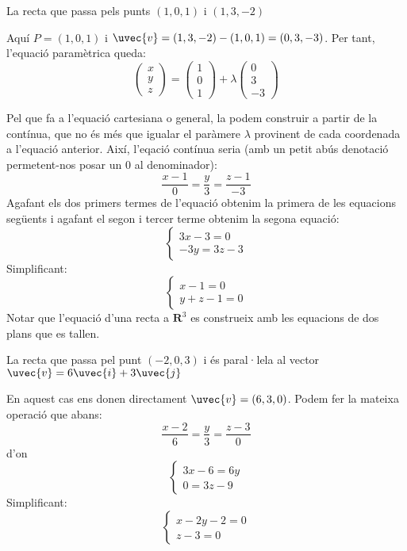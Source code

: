 \begin{llista}
  \item La recta que passa pels punts $(1,0,1)$ i $(1,3,-2)$

  Aquí $P=(1,0,1)$ i $\uvec{v}=(1,3,-2)-(1,0,1)=(0,3,-3)$. Per tant, l'equació paramètrica queda:
  \[
  \begin{pmatrix}x\\y\\z\end{pmatrix}= \begin{pmatrix}1\\0\\1\end{pmatrix}+\lambda\begin{pmatrix}0\\3\\-3\end{pmatrix}
  \]

  Pel que fa a l'equació cartesiana o general, la podem construir a partir de la contínua, que no és més que igualar el paràmere $\lambda$ provinent de cada coordenada a l'equació anterior. Així, l'eqació contínua seria (amb un petit abús denotació permetent-nos posar un $0$ al denominador):
  \[
  \frac{x-1}{0}=\frac{y}{3}=\frac{z-1}{-3}
  \]
  Agafant els dos primers termes de l'equació obtenim la primera de les equacions següents i agafant el segon i tercer terme obtenim la segona equació:
  \[
  \begin{cases}3x-3=0\\-3y=3z-3\end{cases}
  \]
  Simplificant:
  \[
  \begin{cases}x-1=0\\y+z-1=0\end{cases}
  \]
  Notar que l'equació d'una recta a $\mathbf{R}^3$ es construeix amb les equacions de dos plans que es tallen.

  \item La recta que passa pel punt $(-2,0,3)$ i és paral·lela al vector $\uvec{v}=6\uvec{i}+3\uvec{j}$

    En aquest cas ens donen directament $\uvec{v}=(6,3,0)$. Podem fer la mateixa operació que abans:
    \[
    \frac{x-2}{6}=\frac{y}{3}=\frac{z-3}{0}
    \]
    d'on
    \[
    \begin{cases}3x-6=6y\\0=3z-9\end{cases}
    \]
    Simplificant:
    \[
    \begin{cases}x-2y-2=0\\z-3=0\end{cases}
    \]


\end{llista}
